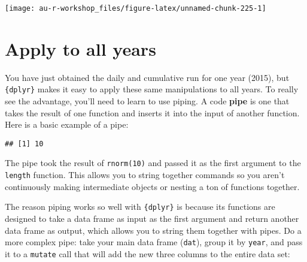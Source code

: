 \documentclass[]{book}
\newenvironment{Shaded}{\begin{snugshade}}{\end{snugshade}}
\newcommand{\KeywordTok}[1]{\textcolor[rgb]{0.13,0.29,0.53}{\textbf{#1}}}
\newcommand{\DataTypeTok}[1]{\textcolor[rgb]{0.13,0.29,0.53}{#1}}
\newcommand{\DecValTok}[1]{\textcolor[rgb]{0.00,0.00,0.81}{#1}}
\newcommand{\StringTok}[1]{\textcolor[rgb]{0.31,0.60,0.02}{#1}}
\newcommand{\OperatorTok}[1]{\textcolor[rgb]{0.81,0.36,0.00}{\textbf{#1}}}
\newcommand{\NormalTok}[1]{#1}
\theoremstyle{definition}
\theoremstyle{definition}
\theoremstyle{definition}
\theoremstyle{remark}
\begin{document}
\begin{center}\texttt{[image: au-r-workshop\_files/figure-latex/unnamed-chunk-225-1]} \end{center}

\section{Apply to all years}\label{apply-to-all-years}

You have just obtained the daily and cumulative run for one year (2015),
but \texttt{\{dplyr\}} makes it easy to apply these same manipulations
to all years. To really see the advantage, you'll need to learn to use
piping. A code \textbf{pipe} is one that takes the result of one
function and inserts it into the input of another function. Here is a
basic example of a pipe:

\begin{Shaded}
\end{Shaded}

\begin{verbatim}
## [1] 10
\end{verbatim}

The pipe took the result of \texttt{rnorm(10)} and passed it as the
first argument to the \texttt{length} function. This allows you to
string together commands so you aren't continuously making intermediate
objects or nesting a ton of functions together.

The reason piping works so well with \texttt{\{dplyr\}} is because its
functions are designed to take a data frame as input as the first
argument and return another data frame as output, which allows you to
string them together with pipes. Do a more complex pipe: take your main
data frame (\texttt{dat}), group it by \texttt{year}, and pass it to a
\texttt{mutate} call that will add the new three columns to the entire
data set:

\begin{Shaded}
\end{Shaded}
\end{document}
